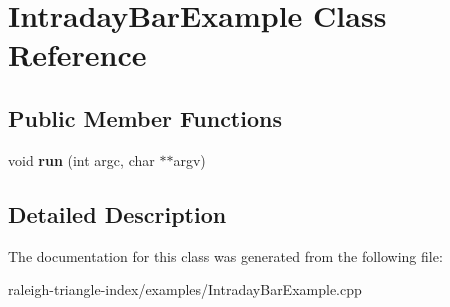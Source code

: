 \section{Intraday\+Bar\+Example Class Reference}
\label{class_intraday_bar_example}
\subsection*{Public Member Functions}
\begin{DoxyCompactItemize}
\item 
void {\bfseries run} (int argc, char $\ast$$\ast$argv)\label{class_intraday_bar_example_ab7242eaa7aac9a2745b4516c5019ed97}

\end{DoxyCompactItemize}


\subsection{Detailed Description}


The documentation for this class was generated from the following file\+:\begin{DoxyCompactItemize}
\item 
raleigh-\/triangle-\/index/examples/Intraday\+Bar\+Example.\+cpp\end{DoxyCompactItemize}

